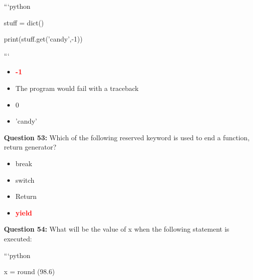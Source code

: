 \documentclass[12pt,a4paper]{article}
\begin{document}
\newline
\newline

\newline
```python\newline

\newline
stuff = dict()\newline

\newline
print(stuff.get('candy',-1))\newline

\newline
```

\begin{itemize}
    \item[\textbf{A.}] \textcolor{red}{\textbf{-1}}
    \item[\textbf{B.}] The program would fail with a traceback
    \item[\textbf{C.}] 0
    \item[\textbf{D.}] 'candy'
\end{itemize}

\vspace{0.5cm}

\textbf{Question 53:} Which of the following reserved keyword is used to end a function, return generator?

\begin{itemize}
    \item[\textbf{A.}] break
    \item[\textbf{B.}] switch
    \item[\textbf{C.}] Return
    \item[\textbf{D.}] \textcolor{red}{\textbf{yield}}
\end{itemize}

\vspace{0.5cm}

\textbf{Question 54:} What will be the value of x when the following statement is executed:\newline

\newline
\newline

\newline
```python\newline

\newline
x = round (98.6)\newline
\end{document}
